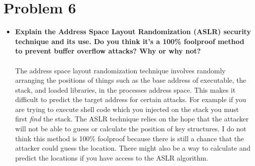\documentclass[11pt]{article}
\begin{document}
\section*{Problem 6}
\begin{itemize}
    \item \textbf{
             Explain the Address Space Layout Randomization (ASLR) security 
             technique and its use. Do you think it's a 100\% foolproof 
             method to prevent buffer overflow attacks? Why or why not?
        }\\\\
        The address space layout randomization technique involves randomly
        arranging the positions of things such as the base address of
        executable, the stack, and loaded libraries, in the processes
        address space. This makes it difficult to predict the target address
        for certain attacks. For example if you are trying to execute
        shell code which you injected on the stack you must first \emph{find}
        the stack. The ASLR technique relies on the hope that the attacker
        will not be able to guess or calculate the position of key structures.
        I do not think this method is 100\% foolproof because there is still
        a chance that the attacker could guess the location. There might also
        be a way to calculate and predict the locations if you have access to
        the ASLR algorithm.
\end{itemize}
\end{document}
